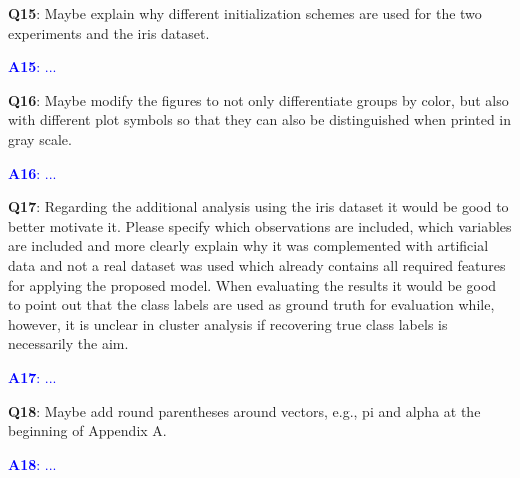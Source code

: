 \documentclass[]{article}
\begin{document}
	\vspace{3mm}
	\textbf{Q15}: Maybe explain why different initialization schemes are used for the two experiments and the iris dataset.

	\textcolor{blue}{  
	\textbf{A15}: ...
	} 

	
	\vspace{3mm}
	\textbf{Q16}:  Maybe modify the figures to not only differentiate groups by color, but also with different plot symbols so that they can also be distinguished when printed in gray scale.

	\textcolor{blue}{  
	\textbf{A16}: ...
	} 

	
	\vspace{3mm}
	\textbf{Q17}: Regarding the additional analysis using the iris dataset it would be good to better motivate it. Please specify which observations are included, which variables are included and more clearly explain why it was complemented with artificial data and not a real dataset was used which already contains all required features for applying the proposed model. When evaluating the results it would be good to point out that the class labels are used as ground truth for evaluation while, however, it is unclear in cluster analysis if recovering true class labels is necessarily the aim.

	\textcolor{blue}{  
	\textbf{A17}: ...
	} 
	
	\vspace{3mm}
	\textbf{Q18}: Maybe add round parentheses around vectors, e.g., pi and alpha at the beginning of Appendix A.
	
	\textcolor{blue}{  
	\textbf{A18}: ...
	} 
	
\end{document}
